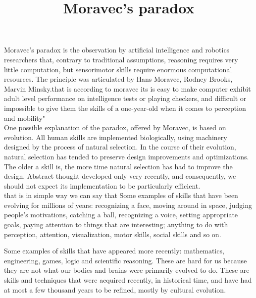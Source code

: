 \documentclass[10pts]{article}
\begin{document}
\title{Moravec's paradox}
\maketitle
Moravec's paradox is the observation by artificial intelligence and robotics researchers that, contrary to traditional assumptions, reasoning requires very little computation, but sensorimotor skills require enormous computational resources. The principle was articulated by Hans Moravec, Rodney Brooks, Marvin Minsky.that is according to moravec its is easy to make computer exhibit adult level performance on intelligence tests or playing checkers, and difficult or impossible to give them the skills of a one-year-old when it comes to perception and mobility"\\
One possible explanation of the paradox, offered by Moravec, is based on evolution. All human skills are implemented biologically, using machinery designed by the process of natural selection. In the course of their evolution, natural selection has tended to preserve design improvements and optimizations. The older a skill is, the more time natural selection has had to improve the design. Abstract thought developed only very recently, and consequently, we should not expect its implementation to be particularly efficient.\\
that is in simple way we can say that Some examples of skills that have been evolving for millions of years: recognizing a face, moving around in space, judging people's motivations, catching a ball, recognizing a voice, setting appropriate goals, paying attention to things that are interesting; anything to do with perception, attention, visualization, motor skills, social skills and so on.

Some examples of skills that have appeared more recently: mathematics, engineering, games, logic and scientific reasoning. These are hard for us because they are not what our bodies and brains were primarily evolved to do. These are skills and techniques that were acquired recently, in historical time, and have had at most a few thousand years to be refined, mostly by cultural evolution.
\end{document}
